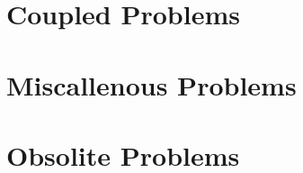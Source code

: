 \documentclass[a4paper,english]{report}    %
\begin{document}
\part{Coupled Problems}

\graphicspath{{./}{RayleighBenard/}}


%

\graphicspath{{./}{InductionHeating/}}


\graphicspath{{./}{FluidStructureBeam/}}


\graphicspath{{./}{ThermalActuator/}}


\graphicspath{{./}{CoatingProcess/}}


\graphicspath{{./}{ArteryFlow/}}




\part{Miscallenous Problems}

\graphicspath{{./}{TemperatureOperatorSplitting/}}


\graphicspath{{./}{PoissonBEM/}}


\graphicspath{{./}{Temperature1D/}}


\graphicspath{{./}{FlowLinearRestriction/}}


\graphicspath{{./}{FlowStreamlines/}}


\graphicspath{{./}{Microfluidic/}}


\graphicspath{{./}{PassiveElements/}}


\part{Obsolite Problems}

%


\appendix

%


\printindex

\end{document}
